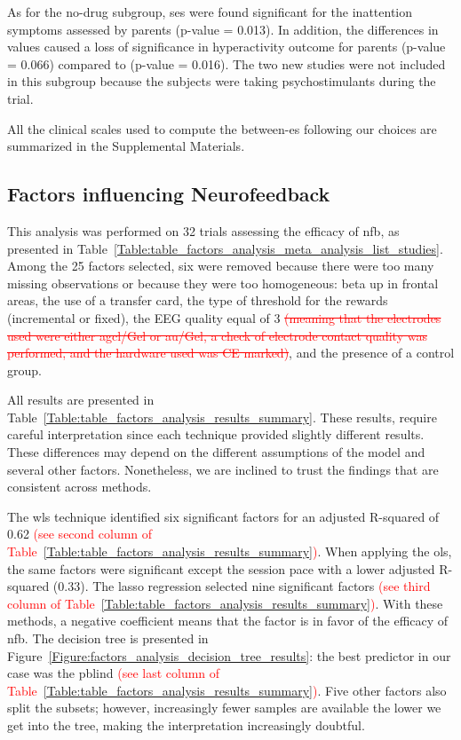 As for the no-drug subgroup, \glspl{se} were found significant for the inattention symptoms assessed by parents (p-value = 0.013). 
In addition, the differences in \citet{Arnold2014} values caused a loss of significance in hyperactivity outcome for parents 
(p-value = 0.066) compared to \citet{Cortese2016} (p-value = 0.016). The two new studies were not included in this 
subgroup because the subjects were taking psychostimulants during the trial.

All the clinical scales used to compute the between-\gls{es} following our choices are summarized in the Supplemental Materials.

\subsection{Factors influencing Neurofeedback}

This analysis was performed on 32 trials assessing the efficacy of \gls{nfb}, as presented 
in Table~\ref{Table:table_factors_analysis_meta_analysis_list_studies}. Among the 25 factors selected, six were 
removed because there were too many missing observations or because they were too homogeneous: beta up in frontal areas, 
the use of a transfer card, the type of threshold for the rewards (incremental or fixed), the EEG quality equal of 3
\textcolor{red}{\sout{(meaning that the electrodes used were either \gls{agcl}/Gel or \gls{au}/Gel, a check of electrode contact quality was
performed, and the hardware used was CE marked)}}, and the presence of a control group. 

All results are presented in Table~\ref{Table:table_factors_analysis_results_summary}. These results, require 
careful interpretation since each technique provided slightly different results. These differences 
may depend on the different assumptions of the model and several other factors. Nonetheless, we are inclined to 
trust the findings that are consistent across methods. 

The \gls{wls} technique identified six significant factors for an adjusted R-squared of 0.62 \textcolor{red}{(see second column of 
Table~\ref{Table:table_factors_analysis_results_summary})}. 
When applying the \gls{ols}, the same factors were significant except the session pace with a lower adjusted R-squared 
(0.33). The \gls{lasso} regression selected nine significant factors \textcolor{red}{(see third column of 
Table~\ref{Table:table_factors_analysis_results_summary})}. With these methods, a negative coefficient means 
that the factor is in favor of the efficacy of \gls{nfb}. The decision tree is presented in Figure~\ref{Figure:factors_analysis_decision_tree_results}: 
the best predictor in our case was the \gls{pblind} \textcolor{red}{(see last column of 
Table~\ref{Table:table_factors_analysis_results_summary})}. Five other factors also split the subsets; however, 
increasingly fewer samples are available the lower we get into the tree, making the interpretation increasingly doubtful.  

